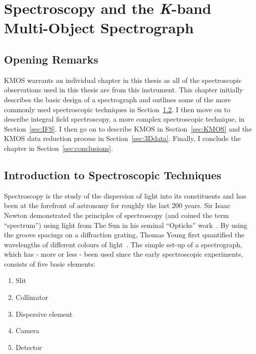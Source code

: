 \chapter{Spectroscopy and the {\it K}-band Multi-Object Spectrograph}
\label{ch:kmos}
\section{Opening Remarks} %
\label{sec:opening_remarks}
KMOS warrants an individual chapter in this thesis as all of the spectroscopic observations used in this thesis are from this instrument.
This chapter initially describes the basic design of a spectrograph and outlines some of the more commonly used spectroscopic techniques in Section~\ref{sec:intro_to_spec}.
I then move on to describe integral field spectroscopy, a more complex spectroscopic technique, in Section~\ref{sec:IFS}.
I then go on to describe KMOS in Section~\ref{sec:KMOS} and the KMOS data reduction process in Section~\ref{sec:3Ddata}.
Finally, I conclude the chapter in Section~\ref{sec:conclusions}.



\section{Introduction to Spectroscopic Techniques} %
\label{sec:intro_to_spec}

Spectroscopy is the study of the dispersion of light into its constituents and has been at the forefront of astronomy for roughly the last 200 years.
Sir Isaac Newton demonstrated the principles of spectroscopy (and coined the term ``spectrum'') using light from The Sun in his seminal ``Opticks'' work~\citep{b:Newton}.
By using the groove spacings on a diffraction grating, Thomas Young first quantified the wavelengths of different colours of light~\citep{1802PTRSL.92.12Y}.
The simple set-up of a spectrograph, which has - more or less - been used since the early spectroscopic experiments, consists of five basic elements:


\begin{enumerate}
    \item Slit
    \item Collimator
    \item Dispersive element
    \item Camera
    \item Detector
\end{enumerate}

